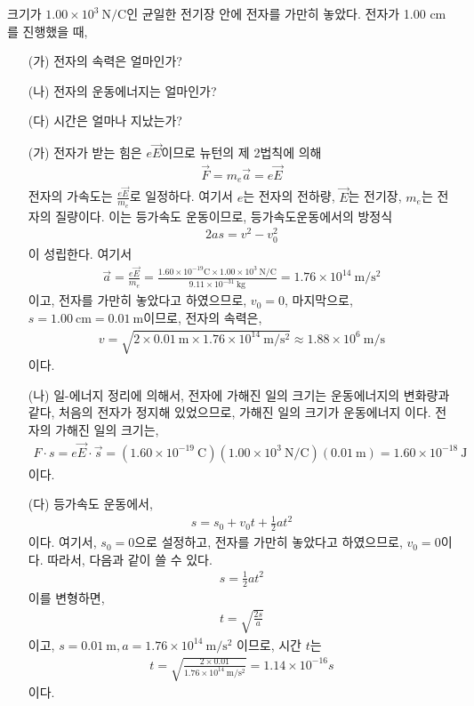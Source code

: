 \documentclass[tightenlines,floatfix,nofootinbib,superscriptaddress,fleqn]{revtex4-2}
\begin{document}
크기가 $1.00\times 10^3~\mathrm{N/C}$인 균일한
전기장 안에 전자를 가만히 놓았다. 전자가 1.00 cm를 진행했을 때,
\begin{itemize}
\item[(가)] 전자의 속력은 얼마인가? 
\item[(나)] 전자의 운동에너지는 얼마인가? 
\item[(다)] 시간은 얼마나 지났는가? 
\end{itemize}
\vspace{1.cm}
\begin{itemize}
\item[(가)] 전자가 받는 힘은 $e\vec{E}$이므로 뉴턴의 제 2법칙에 의해
\begin{align}
  \vec{F}=m_e\vec{a}=e\vec{E}
\end{align}
전자의 가속도는 $\frac{e\vec{E}}{m_e}$로 일정하다.
여기서 $e$는 전자의 전하량, $\vec{E}$는 전기장, $m_e$는 전자의 질량이다.
이는 등가속도 운동이므로, 등가속도운동에서의 방정식 
\begin{align}
  2as=v^2-v_0^2
\end{align}
이 성립한다. 여기서 
\begin{align}
  \vec{a}=\frac{e\vec{E}}{m_e}=\frac{1.60 \times 10^{-19}\mathrm{C} \times 1.00 \times 10^3~\mathrm{N/C}}{9.11\times10^{-31}~\mathrm{kg}}=1.76\times10^{14}~\mathrm{m/s^2}
\end{align}
이고, 전자를 가만히 놓았다고 하였으므로, $v_0=0$, 마지막으로, $s=1.00~\mathrm{cm}=0.01~\mathrm{m}$이므로,
전자의 속력은,
\begin{align}
  v=\sqrt{2\times0.01~\mathrm{m}\times1.76\times10^{14}~\mathrm{m/s^2}}\approx1.88\times10^6~\mathrm{m/s}
\end{align}
이다.
\item[(나)] 
일-에너지 정리에 의해서, 전자에 가해진 일의 크기는 운동에너지의 변화량과 같다,
처음의 전자가 정지해 있었으므로, 가해진 일의 크기가 운동에너지 이다.
전자의 가해진 일의 크기는,
\begin{align}
  F\cdot s=e\vec{E}\cdot \vec{s}=(1.60\times10^{-19}~\mathrm{C})(1.00\times10^3~\mathrm{N/C}) (0.01~\mathrm{m})=1.60\times 10^{-18}~\mathrm{J}
\end{align}
이다.
\item[(다)]
등가속도 운동에서,
\begin{align}
  s=s_0+v_0t+\frac{1}{2}at^2
\end{align}
이다. 여기서, $s_0=0$으로 설정하고, 전자를 가만히 놓았다고 하였으므로, $v_0=0$이다.
따라서, 다음과 같이 쓸 수 있다.
\begin{align}
  s=\frac{1}{2}at^2
\end{align}
이를 변형하면,
\begin{align}
  t=\sqrt{\frac{2s}{a}}
\end{align}
이고, $s=0.01~\mathrm{m}, a=1.76\times10^{14}~\mathrm{m/s^2}$
이므로, 시간 $t$는
\begin{align}
  t=\sqrt{\frac{2\times0.01}{1.76\times10^{14}~\mathrm{m/s^2}}}=1.14\times10^{-16}s
\end{align}
이다.
\end{itemize}
\vspace{1.cm}
\end{document}
